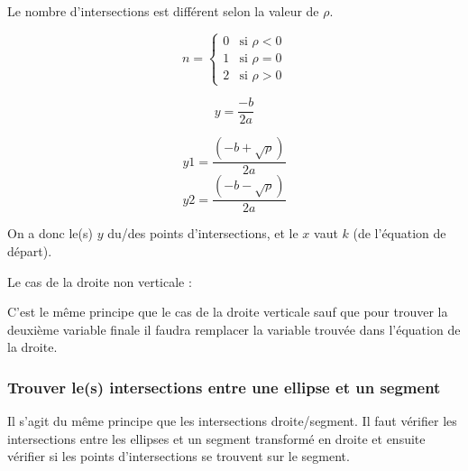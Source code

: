 \documentclass[]{article}
\begin{document}
Le nombre d'intersections est différent selon la valeur de $\rho$.

\[
	n =
	\begin{cases}
		0 & \text{si } \rho < 0 \\
		1 & \text{si } \rho = 0 \\
		2 & \text{si } \rho > 0  
	\end{cases}
\]

$$ y = \frac {-b}{2a} $$

$$ y1 = \frac{(-b + \sqrt{\rho})}{2a} $$
$$ y2 = \frac{(-b - \sqrt{\rho})}{2a} $$

On a donc le(s) $y$ du/des points d'intersections, et le $x$
vaut $k$ (de l'équation de départ).



Le cas de la droite non verticale : 


C'est le même principe que le cas de la droite verticale sauf
que pour trouver la deuxième variable finale il faudra
remplacer la variable trouvée dans l'équation de la droite.

\subsubsection{Trouver le(s) intersections entre une ellipse et un segment}

Il s'agit du même principe que les intersections droite/segment.
Il faut vérifier les intersections entre les ellipses et un segment
transformé en droite et ensuite vérifier si les points d'intersections
se trouvent sur le segment.
\end{document}
